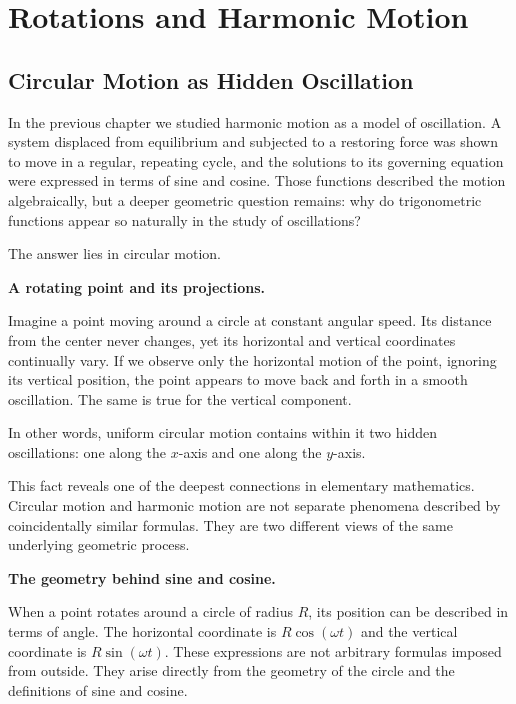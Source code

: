 \documentclass[11pt, openany]{book}
\theoremstyle{plain}
\theoremstyle{definition}
\theoremstyle{remark}
\begin{document}
\chapter{Rotations and Harmonic Motion}

\section*{Circular Motion as Hidden Oscillation}

In the previous chapter we studied harmonic motion as a model of
oscillation. A system displaced from equilibrium and subjected to a
restoring force was shown to move in a regular, repeating cycle, and the
solutions to its governing equation were expressed in terms of sine and
cosine. Those functions described the motion algebraically, but a deeper
geometric question remains: why do trigonometric functions appear so
naturally in the study of oscillations?

The answer lies in circular motion.

\medskip

\textbf{A rotating point and its projections.}

Imagine a point moving around a circle at constant angular speed. Its
distance from the center never changes, yet its horizontal and vertical
coordinates continually vary. If we observe only the horizontal motion
of the point, ignoring its vertical position, the point appears to move
back and forth in a smooth oscillation. The same is true for the
vertical component.

In other words, uniform circular motion contains within it two hidden
oscillations: one along the $x$-axis and one along the $y$-axis.

This fact reveals one of the deepest connections in elementary
mathematics. Circular motion and harmonic motion are not separate
phenomena described by coincidentally similar formulas. They are two
different views of the same underlying geometric process.

\medskip

\textbf{The geometry behind sine and cosine.}

When a point rotates around a circle of radius $R$, its position can be
described in terms of angle. The horizontal coordinate is
$R\cos(\omega t)$ and the vertical coordinate is $R\sin(\omega t)$.
These expressions are not arbitrary formulas imposed from outside. They
arise directly from the geometry of the circle and the definitions of
sine and cosine.
\end{document}
